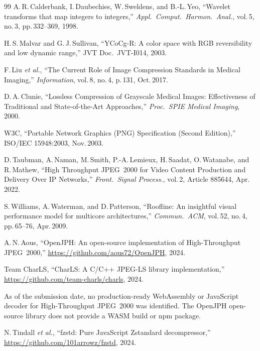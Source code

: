 \documentclass[journal]{IEEEtran}
\begin{document}
\begin{thebibliography}{99}
A.\,R.\,Calderbank, I.\,Daubechies, W.\,Sweldens, and B.-L.\,Yeo,
``Wavelet transforms that map integers to integers,''
\textit{Appl.\ Comput.\ Harmon.\ Anal.}, vol.\,5, no.\,3, pp.\,332--369, 1998.

H.\,S.\,Malvar and G.\,J.\,Sullivan,
``YCoCg-R: A color space with RGB reversibility and low dynamic range,''
JVT Doc.\ JVT-I014, 2003.

F.\,Liu \textit{et al.},
``The Current Role of Image Compression Standards in Medical Imaging,''
\textit{Information}, vol.\,8, no.\,4, p.\,131, Oct.\,2017.

D.\,A.\,Clunie,
``Lossless Compression of Grayscale Medical Images: Effectiveness of
Traditional and State-of-the-Art Approaches,''
\textit{Proc.\ SPIE Medical Imaging}, 2000.

W3C, ``Portable Network Graphics (PNG) Specification (Second Edition),''
ISO/IEC 15948:2003, Nov.\,2003.

D.\,Taubman, A.\,Naman, M.\,Smith, P.-A.\,Lemieux, H.\,Saadat, O.\,Watanabe,
and R.\,Mathew,
``High Throughput JPEG~2000 for Video Content Production and Delivery Over IP
Networks,''
\textit{Front.\ Signal Process.}, vol.\,2, Article 885644, Apr.\,2022.

S.\,Williams, A.\,Waterman, and D.\,Patterson,
``Roofline: An insightful visual performance model for multicore
architectures,''
\textit{Commun.\ ACM}, vol.\,52, no.\,4, pp.\,65--76, Apr.\,2009.

A.\,N.\,Aous,
``OpenJPH: An open-source implementation of High-Throughput JPEG~2000,''
\url{https://github.com/aous72/OpenJPH}, 2024.

Team CharLS,
``CharLS: A C/C++ JPEG-LS library implementation,''
\url{https://github.com/team-charls/charls}, 2024.

As of the submission date, no production-ready WebAssembly or JavaScript decoder
for High-Throughput JPEG~2000 was identified. The OpenJPH open-source library
does not provide a WASM build or npm package.

N.\,Tindall \textit{et al.},
``fzstd: Pure JavaScript Zstandard decompressor,''
\url{https://github.com/101arrowz/fzstd}, 2024.

\end{thebibliography}
\end{document}
